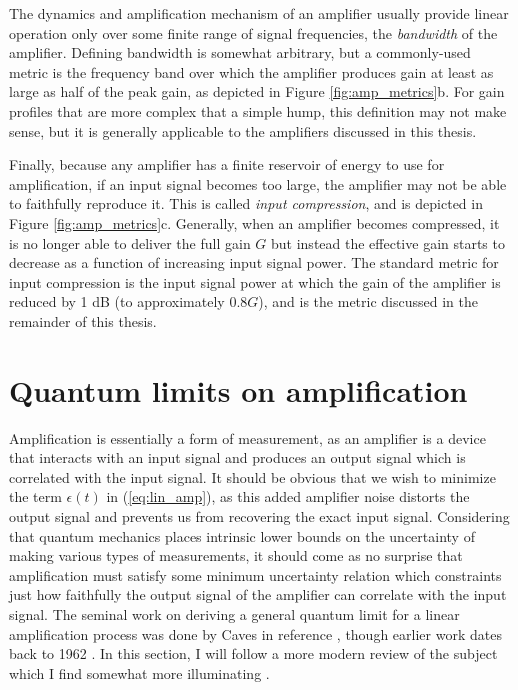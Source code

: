The dynamics and amplification mechanism of an amplifier usually provide linear operation only over some finite range of signal frequencies, the \textit{bandwidth} of the amplifier.  Defining bandwidth is somewhat arbitrary, but a commonly-used metric is the frequency band over which the amplifier produces gain at least as large as half of the peak gain, as depicted in Figure \ref{fig:amp_metrics}b.  For gain profiles that are more complex that a simple hump, this definition may not make sense, but it is generally applicable to the amplifiers discussed in this thesis.

Finally, because any amplifier has a finite reservoir of energy to use for amplification, if an input signal becomes too large, the amplifier may not be able to faithfully reproduce it.  This is called \textit{input compression}, and is depicted in Figure \ref{fig:amp_metrics}c.  Generally, when an amplifier becomes compressed, it is no longer able to deliver the full gain $G$ but instead the effective gain starts to decrease as a function of increasing input signal power.  The standard metric for input compression is the input signal power at which the gain of the amplifier is reduced by 1 dB (to approximately $0.8G$), and is the metric discussed in the remainder of this thesis.



\section{Quantum limits on amplification}

Amplification is essentially a form of measurement, as an amplifier is a device that interacts with an input signal and produces an output signal which is correlated with the input signal.  It should be obvious that we wish to minimize the term $\epsilon(t)$ in (\ref{eq:lin_amp}), as this added amplifier noise distorts the output signal and prevents us from recovering the exact input signal.  Considering that quantum mechanics places intrinsic lower bounds on the uncertainty of making various types of measurements, it should come as no surprise that amplification must satisfy some minimum uncertainty relation which constraints just how faithfully the output signal of the amplifier can correlate with the input signal.  The seminal work on deriving a general quantum limit for a linear amplification process was done by Caves in reference \cite{Caves1982a}, though earlier work dates back to 1962 \cite{PhysRev.128.2407,4066904}.  In this section,
 I will follow a more modern review of the subject which I find somewhat more illuminating \cite{clerk_revmod}.

